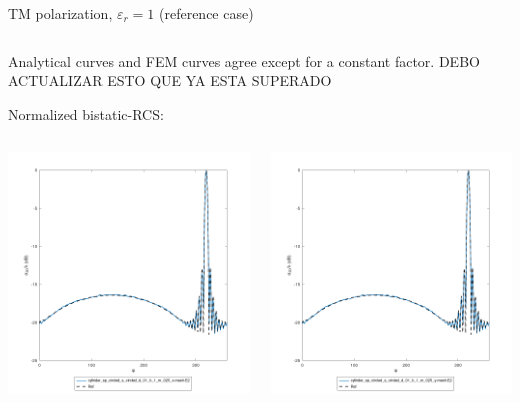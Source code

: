 \begin{frame}{TM polarization, $\varepsilon_r=1$ (reference case)}
\begin{columns}
\end{columns}

\vbs

Analytical curves and FEM curves agree except for a constant factor.
\alert{DEBO ACTUALIZAR ESTO QUE YA ESTA SUPERADO}

Normalized bistatic-RCS:

\vbss

\begin{columns}

\includegraphics[width=\linewidth]{results/FF/cylD_01_H_1_M_025_X/iiee_norm.png}


\includegraphics[width=\linewidth]{results/FF/cylD_01_H_1_M_025_Y/iiee_norm.png}


\end{columns}
\end{frame}
